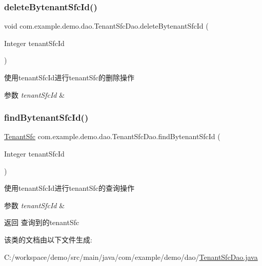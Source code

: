 \subsubsection{\texorpdfstring{delete\+Bytenant\+Sfc\+Id()}{deleteBytenantSfcId()}}
{\footnotesize\ttfamily void com.\+example.\+demo.\+dao.\+Tenant\+Sfc\+Dao.\+delete\+Bytenant\+Sfc\+Id (\begin{DoxyParamCaption}\item[{Integer}]{tenant\+Sfc\+Id }\end{DoxyParamCaption})}

使用tenant\+Sfc\+Id进行tenant\+Sfc的删除操作 
\begin{DoxyParams}{参数}
{\em tenant\+Sfc\+Id} & \\
\hline
\end{DoxyParams}
\mbox{\label{interfacecom_1_1example_1_1demo_1_1dao_1_1_tenant_sfc_dao_a765f6fbc616361a989a1c1bb8e2265ba}} 
\subsubsection{\texorpdfstring{find\+Bytenant\+Sfc\+Id()}{findBytenantSfcId()}}
{\footnotesize\ttfamily \mbox{\hyperlink{classcom_1_1example_1_1demo_1_1modular_1_1_tenant_sfc}{Tenant\+Sfc}} com.\+example.\+demo.\+dao.\+Tenant\+Sfc\+Dao.\+find\+Bytenant\+Sfc\+Id (\begin{DoxyParamCaption}\item[{Integer}]{tenant\+Sfc\+Id }\end{DoxyParamCaption})}

使用tenant\+Sfc\+Id进行tenant\+Sfc的查询操作 
\begin{DoxyParams}{参数}
{\em tenant\+Sfc\+Id} & \\
\hline
\end{DoxyParams}
\begin{DoxyReturn}{返回}
查询到的tenant\+Sfc 
\end{DoxyReturn}


该类的文档由以下文件生成\+:\begin{DoxyCompactItemize}
\item 
C\+:/workspace/demo/src/main/java/com/example/demo/dao/\mbox{\hyperlink{_tenant_sfc_dao_8java}{Tenant\+Sfc\+Dao.\+java}}\end{DoxyCompactItemize}
